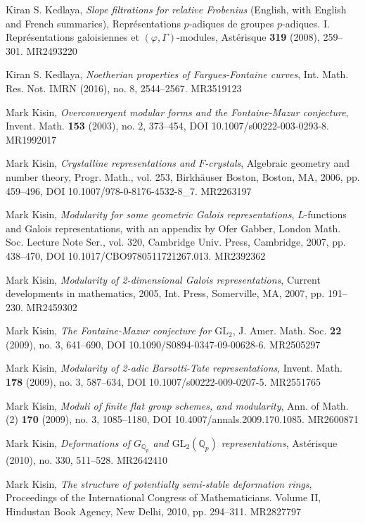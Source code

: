 \item[{[Ked08]}] Kiran S. Kedlaya, \emph{Slope filtrations for relative Frobenius} (English, with English and French summaries), Repr\'esentations $p$-adiques de groupes $p$-adiques. I. Repr\'esentations galoisiennes et $(\varphi,\Gamma)$-modules, Ast\'erisque \textbf{319} (2008), 259--301. MR2493220
\item[{[Ked16]}] Kiran S. Kedlaya, \emph{Noetherian properties of Fargues-Fontaine curves}, Int. Math. Res. Not. IMRN (2016), no. 8, 2544--2567. MR3519123
\item[{[Kis03]}] Mark Kisin, \emph{Overconvergent modular forms and the Fontaine-Mazur conjecture}, Invent. Math. \textbf{153} (2003), no. 2, 373--454, DOI 10.1007/s00222-003-0293-8. MR1992017
\item[{[Kis06]}] Mark Kisin, \emph{Crystalline representations and $F$-crystals}, Algebraic geometry and number theory, Progr. Math., vol. 253, Birkh\"auser Boston, Boston, MA, 2006, pp. 459--496, DOI 10.1007/978-0-8176-4532-8\_7. MR2263197
\item[{[Kis07a]}] Mark Kisin, \emph{Modularity for some geometric Galois representations}, $L$-functions and Galois representations, with an appendix by Ofer Gabber, London Math. Soc. Lecture Note Ser., vol. 320, Cambridge Univ. Press, Cambridge, 2007, pp. 438--470, DOI 10.1017/CBO9780511721267.013. MR2392362
\item[{[Kis07b]}] Mark Kisin, \emph{Modularity of 2-dimensional Galois representations}, Current developments in mathematics, 2005, Int. Press, Somerville, MA, 2007, pp. 191--230. MR2459302
\item[{[Kis09a]}] Mark Kisin, \emph{The Fontaine-Mazur conjecture for $\mathrm{GL}_2$}, J. Amer. Math. Soc. \textbf{22} (2009), no. 3, 641--690, DOI 10.1090/S0894-0347-09-00628-6. MR2505297
\item[{[Kis09b]}] Mark Kisin, \emph{Modularity of 2-adic Barsotti-Tate representations}, Invent. Math. \textbf{178} (2009), no. 3, 587--634, DOI 10.1007/s00222-009-0207-5. MR2551765
\item[{[Kis09c]}] Mark Kisin, \emph{Moduli of finite flat group schemes, and modularity}, Ann. of Math. (2) \textbf{170} (2009), no. 3, 1085--1180, DOI 10.4007/annals.2009.170.1085. MR2600871
\item[{[Kis10a]}] Mark Kisin, \emph{Deformations of $G_{\mathbb{Q}_p}$ and $\mathrm{GL}_2(\mathbb{Q}_p)$ representations}, Ast\'erisque (2010), no. 330, 511--528. MR2642410
\item[{[Kis10b]}] Mark Kisin, \emph{The structure of potentially semi-stable deformation rings}, Proceedings of the International Congress of Mathematicians. Volume II, Hindustan Book Agency, New Delhi, 2010, pp. 294--311. MR2827797
